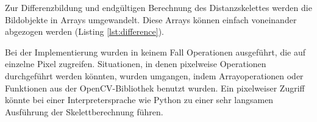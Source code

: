 
Zur Differenzbildung und endgültigen Berechnung des Distanzskelettes werden die Bildobjekte in Arrays umgewandelt. Diese Arrays können einfach voneinander abgezogen werden (Listing \ref{lst:difference}). 

Bei der Implementierung wurden in keinem Fall Operationen ausgeführt, die auf einzelne Pixel zugreifen. Situationen, in denen
pixelweise Operationen durchgeführt werden könnten, wurden
umgangen, indem Arrayoperationen oder Funktionen aus der
OpenCV-Bibliothek benutzt wurden. Ein pixelweiser Zugriff
könnte bei einer Interpretersprache wie Python zu einer sehr langsamen
Ausführung der Skelettberechnung führen.
